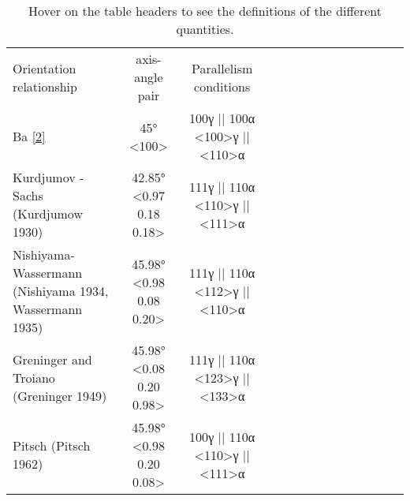 
\begin{table*}
\caption{Hover on the table headers to see the definitions of the  different quantities.}
\label{table}
\begin{tabular}{l c | c c c c c c  c c c c c c}
\hline\hline
    Orientation relationship & axis-angle pair & Parallelism conditions \\
    Ba \hyperref[csl:2]{[2]} & 45° <100> & {100}γ || {100}α <100>γ || <110>α \\
    Kurdjumov -Sachs (Kurdjumow 1930) & 42.85° <0.97 0.18 0.18> & {111}γ || {110}α <110>γ || <111>α \\
    Nishiyama-Wassermann (Nishiyama 1934, Wassermann 1935) & 45.98° <0.98 0.08 0.20> & {111}γ || {110}α <112>γ || <110>α \\
    Greninger and Troiano (Greninger 1949) & 45.98° <0.08 0.20 0.98> & {111}γ || {110}α <123>γ || <133>α \\
    Pitsch (Pitsch 1962) & 45.98° <0.98 0.20 0.08> & {100}γ || {110}α <110>γ || <111>α \\
\hline
\end{tabular}
\end{table*}
